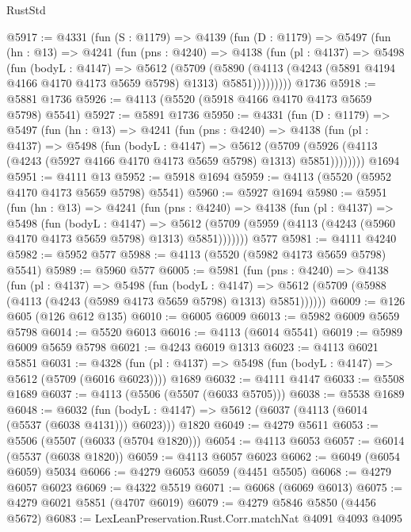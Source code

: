 \begin{lexlean}{RustStd}
\begin{coremodule}
@5917 := @4331
    (fun (S : @1179) =>
    @4139
      (fun (D : @1179) =>
      @5497
        (fun (hn : @13) =>
        @4241
          (fun (pns : @4240) =>
          @4138
            (fun (pl : @4137) =>
            @5498
              (fun (bodyL : @4147) =>
              @5612
                (@5709
                  (@5890
                    (@4113 (@4243 (@5891 @4194 @4166 @4170 @4173 @5659 @5798) @1313) @5851)))))))))
    @1736
@5918 := @5881 @1736
@5926 := @4113 (@5520 (@5918 @4166 @4170 @4173 @5659 @5798) @5541)
@5927 := @5891 @1736
@5950 := @4331
    (fun (D : @1179) =>
    @5497
      (fun (hn : @13) =>
      @4241
        (fun (pns : @4240) =>
        @4138
          (fun (pl : @4137) =>
          @5498
            (fun (bodyL : @4147) =>
            @5612
              (@5709 (@5926 (@4113 (@4243 (@5927 @4166 @4170 @4173 @5659 @5798) @1313) @5851))))))))
    @1694
@5951 := @4111 @13
@5952 := @5918 @1694
@5959 := @4113 (@5520 (@5952 @4170 @4173 @5659 @5798) @5541)
@5960 := @5927 @1694
@5980 := @5951
    (fun (hn : @13) =>
    @4241
      (fun (pns : @4240) =>
      @4138
        (fun (pl : @4137) =>
        @5498
          (fun (bodyL : @4147) =>
          @5612 (@5709 (@5959 (@4113 (@4243 (@5960 @4170 @4173 @5659 @5798) @1313) @5851)))))))
    @577
@5981 := @4111 @4240
@5982 := @5952 @577
@5988 := @4113 (@5520 (@5982 @4173 @5659 @5798) @5541)
@5989 := @5960 @577
@6005 := @5981
    (fun (pns : @4240) =>
    @4138
      (fun (pl : @4137) =>
      @5498
        (fun (bodyL : @4147) =>
        @5612 (@5709 (@5988 (@4113 (@4243 (@5989 @4173 @5659 @5798) @1313) @5851))))))
@6009 := @126 @605 (@126 @612 @135)
@6010 := @6005 @6009
@6013 := @5982 @6009 @5659 @5798
@6014 := @5520 @6013
@6016 := @4113 (@6014 @5541)
@6019 := @5989 @6009 @5659 @5798
@6021 := @4243 @6019 @1313
@6023 := @4113 @6021 @5851
@6031 := @4328
    (fun (pl : @4137) => @5498 (fun (bodyL : @4147) => @5612 (@5709 (@6016 @6023))))
    @1689
@6032 := @4111 @4147
@6033 := @5508 @1689
@6037 := @4113 (@5506 (@5507 (@6033 @5705)))
@6038 := @5538 @1689
@6048 := @6032
    (fun (bodyL : @4147) => @5612 (@6037 (@4113 (@6014 (@5537 (@6038 @4131))) @6023)))
    @1820
@6049 := @4279 @5611
@6053 := @5506 (@5507 (@6033 (@5704 @1820)))
@6054 := @4113 @6053
@6057 := @6014 (@5537 (@6038 @1820))
@6059 := @4113 @6057 @6023
@6062 := @6049 (@6054 @6059) @5034
@6066 := @4279 @6053 @6059 (@4451 @5505)
@6068 := @4279 @6057 @6023
@6069 := @4322 @5519
@6071 := @6068 (@6069 @6013)
@6075 := @4279 @6021 @5851 (@4707 @6019)
@6079 := @4279 @5846 @5850 (@4456 @5672)
@6083 := LexLeanPreservation.Rust.Corr.matchNat @4091 @4093 @4095

\end{coremodule}
\end{lexlean}
